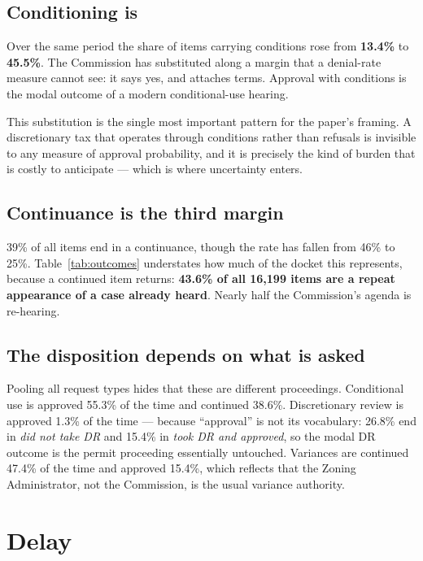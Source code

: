 \documentclass[11pt]{article}
\begin{document}
\subsection{Conditioning is}

Over the same period the share of items carrying conditions rose from \textbf{13.4\%} to
\textbf{45.5\%}. The Commission has substituted along a margin that a denial-rate measure
cannot see: it says yes, and attaches terms. Approval with conditions is the modal outcome of
a modern conditional-use hearing.

This substitution is the single most important pattern for the paper's framing. A discretionary
tax that operates through conditions rather than refusals is invisible to any measure of
approval probability, and it is precisely the kind of burden that is costly to anticipate ---
which is where uncertainty enters.

\subsection{Continuance is the third margin}

39\% of all items end in a continuance, though the rate has fallen from 46\% to 25\%.
Table~\ref{tab:outcomes} understates how much of the docket this represents, because a
continued item returns: \textbf{43.6\% of all 16{,}199 items are a repeat appearance of a
case already heard}. Nearly half the Commission's agenda is re-hearing.

\subsection{The disposition depends on what is asked}

Pooling all request types hides that these are different proceedings. Conditional use is
approved 55.3\% of the time and continued 38.6\%. Discretionary review is approved 1.3\% of
the time --- because ``approval'' is not its vocabulary: 26.8\% end in \emph{did not take DR}
and 15.4\% in \emph{took DR and approved}, so the modal DR outcome is the permit proceeding
essentially untouched. Variances are continued 47.4\% of the time and approved 15.4\%, which
reflects that the Zoning Administrator, not the Commission, is the usual variance authority.

\section{Delay}
\end{document}
